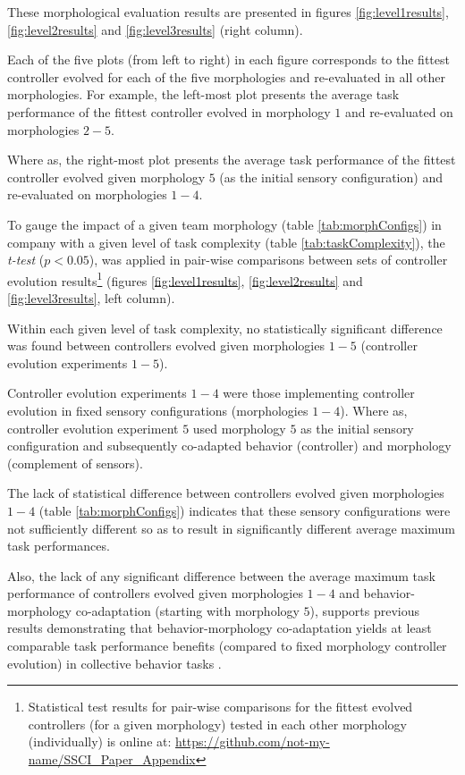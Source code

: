 These morphological evaluation results are presented in figures \ref{fig:level1results}, \ref{fig:level2results}
and \ref{fig:level3results} (right column).

Each of the five plots (from left to right) in each figure corresponds to the fittest controller evolved for each of the
five morphologies and re-evaluated in all other morphologies.  
For example, the left-most plot presents
the average task performance of the fittest controller evolved in morphology $1$ and re-evaluated on morphologies $2-5$.

Where as, the right-most plot presents the average task performance of the fittest controller evolved given morphology $5$
(as the initial sensory configuration) and re-evaluated on morphologies $1-4$.

To gauge the impact of a given team morphology (table \ref{tab:morphConfigs})
in company with a given level of task complexity (table \ref{tab:taskComplexity}),
the \textit{t-test} \cite{FlanneryTeukolsky1986} ($p < 0.05$),
was applied in pair-wise comparisons between sets of controller evolution
results\footnote{Statistical test results for pair-wise comparisons for the fittest evolved controllers
(for a given morphology) tested in each other morphology (individually) is online at:
\url{https://github.com/not-my-name/SSCI_Paper_Appendix}}
(figures \ref{fig:level1results}, \ref{fig:level2results} and \ref{fig:level3results}, left column).

Within each given level of task complexity, no statistically significant difference was found between
controllers evolved given morphologies $1-5$ (controller evolution experiments $1-5$).

Controller evolution experiments $1-4$ were those implementing controller evolution in fixed sensory
configurations (morphologies $1-4$).  Where as, controller evolution experiment $5$ used morphology $5$
as the initial sensory configuration and subsequently co-adapted behavior (controller) and morphology
(complement of sensors).

The lack of statistical difference between controllers evolved given morphologies $1-4$ (table \ref{tab:morphConfigs})
indicates that these sensory configurations were not sufficiently different so as to result in
significantly different average maximum task performances.

Also, the lack of any significant difference between the average maximum task performance of controllers
evolved given morphologies $1-4$ and behavior-morphology co-adaptation (starting with morphology $5$),
supports previous results demonstrating that behavior-morphology co-adaptation
yields at least comparable task performance benefits (compared to fixed morphology controller evolution)
in collective behavior tasks \cite{HewlandNitschke2015}.

